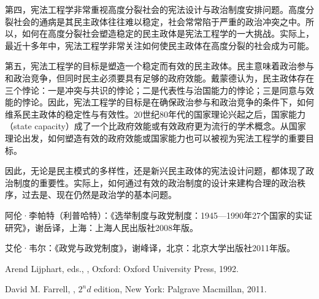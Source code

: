 第四，宪法工程学非常重视高度分裂社会的宪法设计与政治制度安排问题。高度分裂社会的通病是其民主政体往往难以稳定，社会常常陷于严重的政治冲突之中。所以，如何在高度分裂社会塑造稳定的民主政体是宪法工程学的一大挑战。实际上，最近十多年中，宪法工程学非常关注如何使民主政体在高度分裂的社会成为可能。

第五，宪法工程学的目标是塑造一个稳定而有效的民主政体。民主意味着政治参与和政治竞争，但同时民主必须要具有足够的政府效能。戴蒙德认为，民主政体存在三个悖论：一是冲突与共识的悖论；二是代表性与治国能力的悖论；三是同意与效能的悖论。因此，宪法工程学的目标是在确保政治参与和政治竞争的条件下，如何维系民主政体的稳定性与有效性。20世纪80年代的国家理论兴起之后，国家能力（state capacity）成了一个比政府效能或有效政府更为流行的学术概念。从国家理论出发，如何塑造有效的政府效能或国家能力也可以被视为宪法工程学的重要目标。

因此，无论是民主模式的多样性，还是新兴民主政体的宪法设计问题，都体现了政治制度的重要性。实际上，如何通过有效的政治制度的设计来建构合理的政治秩序，过去是、现在仍然是政治学的基本问题。


阿伦·李帕特（利普哈特）：《选举制度与政党制度：1945—1990年27个国家的实证研究》，谢岳译，上海：上海人民出版社2008年版。

艾伦·韦尔：《政党与政党制度》，谢峰译，北京：北京大学出版社2011年版。

Arend Lijphart, eds., , Oxford: Oxford University Press, 1992.

David M. Farrell, , $2^nd$ edition, New York: Palgrave Macmillan, 2011.
